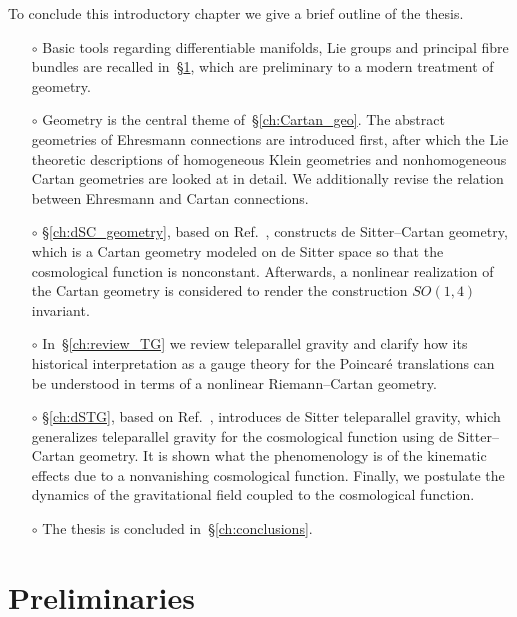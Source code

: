 \documentclass[
final,
11pt,
a4paper,
DIV=11,
headinclude=true,
footinclude=false,
bibliography=totoc,
twoside=true,  %
BCOR=5mm
]{scrbook}
\begin{document}
To conclude this introductory chapter we give a brief outline of 
the thesis.
\begin{itemize}
  \item[$\circ$] Basic tools regarding differentiable manifolds, 
    Lie groups and principal fibre bundles are recalled 
    in~\S\ref{ch:prelim}, which are preliminary to a modern 
    treatment of geometry.%
    \vspace{3pt}
  \item[$\circ$] Geometry is the central theme 
    of~\S\ref{ch:Cartan_geo}. The abstract geometries of 
    Ehresmann connections are introduced first, after which the 
    Lie theoretic descriptions of homogeneous Klein geometries 
    and nonhomogeneous Cartan geometries are looked at in detail.  
    We additionally revise the relation between Ehresmann and 
    Cartan connections.
    \vspace{3pt}
  \item[$\circ$] \S\ref{ch:dSC_geometry}, based on 
    Ref.~\cite{Jennen:2014mba}, constructs de Sitter--Cartan 
    geometry, which is a Cartan geometry modeled on de Sitter 
    space so that the cosmological function is nonconstant.  
    Afterwards, a nonlinear realization of the Cartan geometry is 
    considered to render the construction $SO(1,4)$ invariant.%
    \vspace{3pt}
  \item[$\circ$] In~\S\ref{ch:review_TG} we review teleparallel 
    gravity and clarify how its historical interpretation as 
    a gauge theory for the Poincar\'e translations can be 
    understood in terms of a nonlinear Riemann--Cartan geometry.
    \vspace{3pt}
  \item[$\circ$] \S\ref{ch:dSTG}, based on 
    Ref.~\cite{Jennen:2015bxa}, introduces de Sitter teleparallel 
    gravity, which generalizes teleparallel gravity for the 
    cosmological function using de Sitter--Cartan geometry. It is 
    shown what the phenomenology is of the kinematic effects due 
    to a nonvanishing cosmological function. Finally, we 
    postulate the dynamics of the gravitational field coupled to 
    the cosmological function.
    \vspace{3pt}
  \item[$\circ$] The thesis is concluded 
    in~\S\ref{ch:conclusions}.
\end{itemize}

\chapter{Preliminaries}
\label{ch:prelim}
\end{document}
